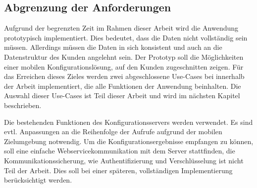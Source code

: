 \subsection{Abgrenzung der Anforderungen}
Aufgrund der begrenzten Zeit im Rahmen dieser Arbeit wird die Anwendung prototypisch implementiert. Dies bedeutet, dass die Daten nicht vollständig sein müssen. Allerdings müssen die Daten in sich konsistent und auch an die Datenstruktur des Kunden angelehnt sein. Der Prototyp soll die Möglichkeiten einer mobilen Konfigurationslösung, auf den Kunden zugeschnitten zeigen. Für das Erreichen dieses Zieles werden zwei abgeschlossene Use-Cases bei innerhalb der Arbeit implementiert, die alle Funktionen der Anwendung beinhalten. Die Auswahl dieser Use-Cases ist Teil dieser Arbeit und wird im nächsten Kapitel beschrieben. \par

 Die bestehenden Funktionen des Konfigurationsservers werden verwendet. Es sind evtl. Anpassungen an die Reihenfolge der Aufrufe aufgrund der mobilen Zielumgebung notwendig. Um die Konfigurationsergebnisse empfangen zu können, soll eine einfache Webservicekommunikation mit dem Server stattfinden, die Kommunikationssicherung, wie Authentifizierung und Verschlüsselung ist nicht Teil der Arbeit. Dies soll bei einer späteren, vollständigen Implementierung berücksichtigt werden.

